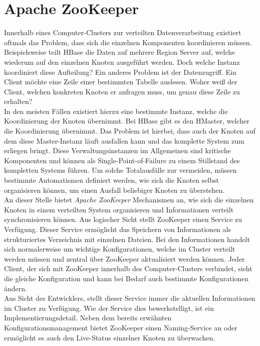 \noindent


\section{Apache ZooKeeper}
\label{sec:theory_zookeeper}

Innerhalb eines Computer-Clusters zur verteilten Datenverarbeitung existiert oftmals das Problem, dass sich die einzelnen Komponenten koordinieren müssen. Beispielsweise teilt HBase die Daten auf mehrere Region Server auf, welche wiederum auf den einzelnen Knoten ausgeführt werden. Doch welche Instanz koordiniert diese Aufteilung? Ein anderes Problem ist der Datenzugriff. Ein Client möchte eine Zeile einer bestimmten Tabelle auslesen. Woher weiß der Client, welchen konkreten Knoten er anfragen muss, um genau diese Zeile zu erhalten?\\ 
In den meisten Fällen existiert hierzu eine bestimmte Instanz, welche die Koordinierung der Knoten übernimmt. Bei HBase gibt es den HMaster, welcher die Koordinierung übernimmt. Das Problem ist hierbei, dass auch der Knoten auf dem diese Master-Instanz läuft ausfallen kann und das komplette System zum erliegen bringt. Diese Verwaltungsinstanzen im Allgemeinen sind kritische Komponenten und können als Single-Point-of-Failure zu einem Stillstand des kompletten Systems führen. Um solche Totalausfälle zur vermeiden, müssen bestimmte Automatismen definiert werden, wie sich die Knoten selbst organisieren können, um einen Ausfall beliebiger Knoten zu überstehen.\\

\noindent
An dieser Stelle bietet \textit{Apache ZooKeeper\texttrademark\thinspace} Mechanismen an, wie sich die einzelnen Knoten in einem verteilten System organisieren und Informationen verteilt synchronisieren können. Aus logischer Sicht stellt ZooKeeper einen Service zu Verfügung. 
Dieser Service ermöglicht das Speichern von Informationen als strukturiertes Verzeichnis mit einzelnen Dateien. Bei den Informationen handelt sich normalerweise um wichtige Konfigurationen, welche im Cluster verteilt werden müssen und zentral über ZooKeeper aktualisiert werden können. Jeder Client, der sich mit ZooKeeper innerhalb des Computer-Clusters verbindet, sieht die gleiche Konfiguration und kann bei Bedarf auch bestimmte Konfigurationen ändern.\cite[S. 4 ff]{professional_hadoop} \\
Aus Sicht des Entwicklers, stellt dieser Service immer die aktuellen Informationen im Cluster zu Verfügung. Wie der Service dies bewerkstelligt, ist ein Implementierungsdetail. 
Neben dem bereits erwähnten Konfigurationsmanagement bietet ZooKeeper einen Naming-Service an oder ermöglicht es auch den Live-Status einzelner Knoten zu überwachen.\cite{zookeeper_essentials}\\

